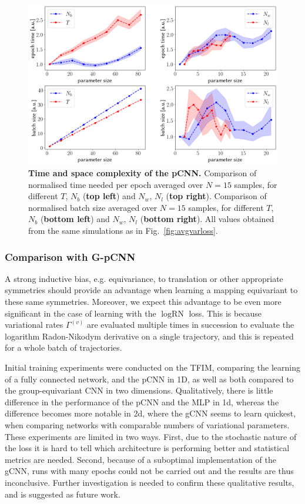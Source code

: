 \begin{figure}[H]
	\centering
	\includegraphics[width=\linewidth]{Chapter5/Figs/Raster/initial_time_space}
	\caption[Time and space complexity of the pCNN]{\textbf{Time and space complexity of the pCNN.} Comparison of normalised time needed per epoch averaged over $N=15$ samples, for different $T$, $N_b$ (\textbf{top left}) and $N_w$, $N_l$ (\textbf{top right}). Comparison of normalised batch size averaged over $N=15$ samples, for different $T$, $N_b$ (\textbf{bottom left}) and $N_w$, $N_l$ (\textbf{bottom right}). All values obtained from the same simulations as in Fig.~\ref{fig:avgvarloss}.}
	\label{fig:initialtimespace}
\end{figure}

\subsubsection{Comparison with G-pCNN}
A strong inductive bias, e.g. equivariance, to translation or other appropriate symmetries should provide an advantage when learning a mapping equivariant to these same symmetries. Moreover, we expect this advantage to be even more significant in the case of learning with the $\log \text{RN}$ loss. This is because variational rates $\Gamma^{(v)}$ are evaluated multiple times in succession to evaluate the logarithm Radon-Nikodym derivative on a single trajectory, and this is repeated for a whole batch of trajectories.  

Initial training experiments were conducted on the TFIM, comparing the learning of a fully connected network, and the pCNN in 1D, as well as both compared to the group-equivariant CNN in two dimensions. Qualitatively, there is little difference in the performance of the pCNN and the MLP in 1d, whereas the difference becomes more notable in 2d, where the gCNN seems to learn quickest, when comparing networks with comparable numbers of variational parameters. These experiments are limited in two ways. First, due to the stochastic nature of the loss it is hard to tell which architecture is performing better and statistical metrics are needed. Second, because of a suboptimal implementation of the gCNN, runs with many epochs could not be carried out and the results are thus inconclusive. Further investigation is needed to confirm these qualitative results, and is suggested as future work. 

